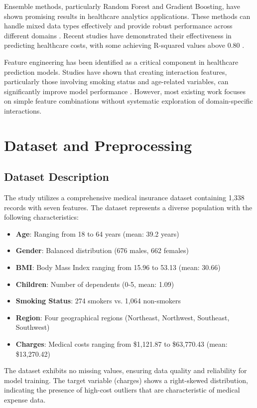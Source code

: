 \documentclass[times, twoside, watermark]{zHenriquesLab-StyleBioRxiv}
\begin{document}
Ensemble methods, particularly Random Forest and Gradient Boosting, have shown promising results in healthcare analytics applications. These methods can handle mixed data types effectively and provide robust performance across different domains \cite{Breiman2001}. Recent studies have demonstrated their effectiveness in predicting healthcare costs, with some achieving R-squared values above 0.80 \cite{Chen2016}.

Feature engineering has been identified as a critical component in healthcare prediction models. Studies have shown that creating interaction features, particularly those involving smoking status and age-related variables, can significantly improve model performance \cite{Kuhn2013}. However, most existing work focuses on simple feature combinations without systematic exploration of domain-specific interactions.

\section*{Dataset and Preprocessing}

\subsection*{Dataset Description}

The study utilizes a comprehensive medical insurance dataset containing 1,338 records with seven features. The dataset represents a diverse population with the following characteristics:

\begin{itemize}
\item \textbf{Age}: Ranging from 18 to 64 years (mean: 39.2 years)
\item \textbf{Gender}: Balanced distribution (676 males, 662 females)
\item \textbf{BMI}: Body Mass Index ranging from 15.96 to 53.13 (mean: 30.66)
\item \textbf{Children}: Number of dependents (0-5, mean: 1.09)
\item \textbf{Smoking Status}: 274 smokers vs. 1,064 non-smokers
\item \textbf{Region}: Four geographical regions (Northeast, Northwest, Southeast, Southwest)
\item \textbf{Charges}: Medical costs ranging from \$1,121.87 to \$63,770.43 (mean: \$13,270.42)
\end{itemize}

The dataset exhibits no missing values, ensuring data quality and reliability for model training. The target variable (charges) shows a right-skewed distribution, indicating the presence of high-cost outliers that are characteristic of medical expense data.
\end{document}
